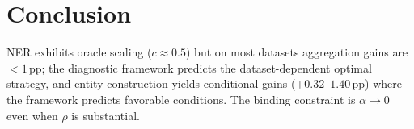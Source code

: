 \section{Conclusion}\label{sec:conclusion}

NER exhibits oracle scaling ($c{\approx}0.5$) but on most datasets aggregation gains are ${<}1$\,pp; the diagnostic framework predicts the dataset-dependent optimal strategy, and entity construction yields conditional gains ($+0.32$--$1.40$\,pp) where the framework predicts favorable conditions.
The binding constraint is $\alpha{\to}0$ even when $\rho$ is substantial.
